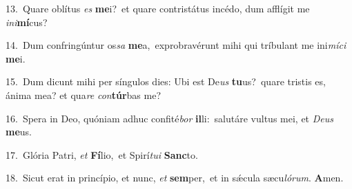 {\numbfont\textcolor{\numbcolor}{13.}}~Quare oblítus \textit{es} \textbf{me}\-i?~\star et quare contristátus incédo, dum afflígit me \textit{in}\-\textit{i}\textbf{mí}cus?\par
{\numbfont\textcolor{\numbcolor}{14.}}~Dum confringúntur os\textit{sa} \textbf{me}\-a,~\star exprobravérunt mihi qui tríbulant me ini\-\textit{mí}\-\textit{ci} \textbf{me}\-i.\par
{\numbfont\textcolor{\numbcolor}{15.}}~Dum dicunt mihi per síngulos dies: Ubi est De\textit{us} \textbf{tu}\-us?~\star quare tristis es, ánima mea? et qua\textit{re} \textit{con}\-\textbf{túr}bas me?\par
{\numbfont\textcolor{\numbcolor}{16.}}~Spera in Deo, quóniam adhuc confité\textit{bor} \textbf{il}\-li:~\star salutáre vultus mei, et \textit{De}\-\textit{us} \textbf{me}\-us.\par
{\numbfont\textcolor{\numbcolor}{17.}}~Glória Patri, \textit{et} \textbf{Fí}\-lio,~\star et Spirí\-\textit{tu}\-\textit{i} \textbf{Sanc}\-to.\par
{\numbfont\textcolor{\numbcolor}{18.}}~Sicut erat in princípio, et nunc, \textit{et} \textbf{sem}\-per,~\star et in sǽcula sæcu\-\textit{ló}\-\textit{rum}. \textbf{A}\-men.\par
